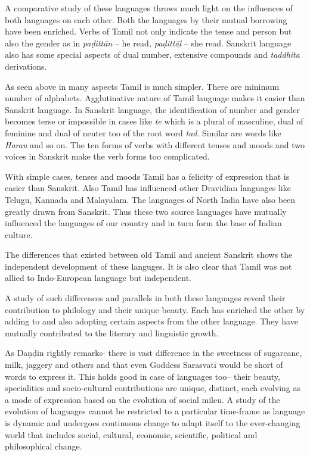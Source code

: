 A comparative study of these languages throws much light on the influences of both languages on each other. Both the languages by their mutual borrowing have been enriched. Verbs of Tamil not only indicate the tense and person but also the gender as in \textit{paḍittān} – he read\textit{, paḍittāḻ} – she read. Sanskrit language also has some special aspects of dual number, extensive compounds and \textit{taddhita} derivations.

As seen above in many aspects Tamil is much simpler. There are minimum number of alphabets. Agglutinative nature of Tamil language makes it easier than Sanskrit language. In Sanskrit language, the identification of number and gender becomes terse or impossible in cases like \textit{te} which is a plural of masculine, dual of feminine and dual of neuter too of the root word \textit{tad}. Similar are words like \textit{Harau} and so on. The ten forms of verbs with different tenses and moods and two voices in Sanskrit make the verb forms too complicated.

With simple cases, tenses and moods Tamil has a felicity of expression that is easier than Sanskrit. Also Tamil has influenced other Dravidian languages like Telugu, Kannada and Malayalam. The languages of North India have also been greatly drawn from Sanskrit. Thus these two source languages have mutually influenced the languages of our country and in turn form the base of Indian culture.

The differences that existed between old Tamil and ancient Sanskrit shows the independent development of these languges. It is also clear that Tamil was not allied to Indo-European language but independent.

A study of such differences and parallels in both these languages reveal their contribution to philology and their unique beauty. Each has enriched the other by adding to and also adopting certain aspects from the other language. They have mutually contributed to the literary and linguistic growth.

As Daṇḍin rightly remarks- there is vast difference in the sweetness of sugarcane, milk, jaggery and others and that even Goddess Sarasvatī would be short of words to express it. This holds good in case of languages too– their beauty, specialities and socio-cultural contributions are unique, distinct, each evolving as a mode of expression based on the evolution of social mileu. A study of the evolution of languages cannot be restricted to a particular time-frame as language is dynamic and undergoes continuous change to adapt itself to the ever-changing world that includes social, cultural, economic, scientific, political and philosophical change.


